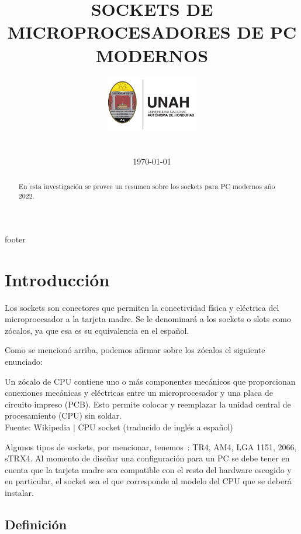 \documentclass[conference]{IEEEtran}
\title{SOCKETS DE MICROPROCESADORES DE PC MODERNOS}
\author{
    \includegraphics[width = 40mm]{images/logo-unah}\\[8ex]
    \IEEEauthorblockN{Tobias Briones}
    \IEEEauthorblockN{tobias.briones@unah.hn}
    \IEEEauthorblockA{\textit{Universidad Nacional Autónoma de Honduras} \\
    \textit{Ingeniería de Sistemas} \\
    \textit{I PAC 2022} \\
    \textit{IS911-MICROPROCESADORES}} \\\vspace*{20pt} \normalsize  \\
    \today
}
\begin{document}
    \maketitle

    \begin{abstract}
        En esta investigación se provee un resumen sobre los sockets para PC
        modernos año 2022.
    \end{abstract}

    \tableofcontents

    {footer}

    \section{Introducción}\label{sec:introduction}

    Los sockets son conectores que permiten la conectividad física y
    eléctrica del microprocesador a la tarjeta madre. Se le denominará a los
    sockets o slots como zócalos, ya que esa es su equivalencia en el español.

    \bigbreak

    Como se mencionó arriba, podemos afirmar sobre los zócalos el siguiente
    enunciado:

    \begin{displayquote}
        Un zócalo de CPU contiene uno o más componentes mecánicos que
        proporcionan conexiones mecánicas y eléctricas entre un
        microprocesador y una placa de circuito impreso (PCB). Esto permite
        colocar y reemplazar la unidad central de procesamiento (CPU) sin
        soldar.\\
        \small Fuente: Wikipedia $\mid$ CPU socket (traducido de inglés a
        español)~\cite{wikipedia-contributors-2022}
    \end{displayquote}

    \bigbreak

    Algunos tipos de sockets, por mencionar, tenemos~\cite{authortechnews-2020}: TR4, AM4, LGA 1151, 2066, sTRX4. Al momento
    de diseñar una configuración para un PC se debe tener en cuenta que la
    tarjeta madre sea compatible con el resto del hardware escogido y en
    particular, el socket sea el que corresponde al modelo del CPU que se
    deberá instalar.

    \subsection{Definición}\label{subsec:def}
\end{document}
